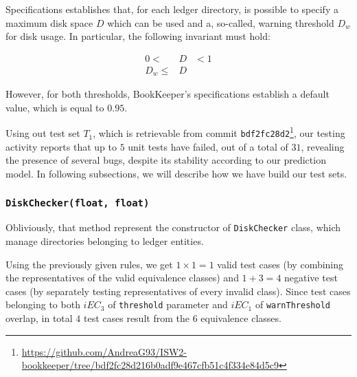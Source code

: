 \documentclass[sigconf]{acmart}
\begin{document}
Specifications establishes that, for each ledger directory, is possible to specify a maximum disk space $D$ which can be used and a, so-called, warning threshold $D_w$ for disk usage\cite{BookKeeperConfiguration}. In particular, the following invariant must hold:

\begin{eqnarray}
0  <  & D &  <  1 \nonumber \\
D_w  \leq  & D & 
\end{eqnarray}

However, for both thresholds, BookKeeper's specifications establish a default value, which is equal to $0.95$. 

Using out test set $T_1$, which is retrievable from commit \texttt{bdf2fc28d2}\footnote{\url{https://github.com/AndreaG93/ISW2-bookkeeper/tree/bdf2fc28d216b0adf9e467cfb51c4f334e84d5c9}}, our testing activity reports that up to $5$ unit tests have failed, out of a total of $31$, revealing the presence of several bugs, despite its stability according to our prediction model. In following subsections, we will describe how we have build our test sets.









\subsubsection{\texttt{DiskChecker(float, float)}}

Obliviously, that method represent the constructor of \texttt{DiskChecker} class, which manage directories belonging to ledger entities. 

Using the previously given rules, we get $1 \times 1 = 1$ valid test cases (by combining the representatives of the valid equivalence classes) and $1 + 3 = 4$ negative test cases
(by separately testing representatives of every invalid class). Since test cases belonging to both $iEC_3$ of  \texttt{threshold} parameter and $iEC_1$ of \texttt{warnThreshold} overlap, in total $4$ test cases result from the $6$ equivalence classes.
\end{document}
